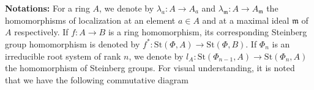 \documentclass[11pt]{amsart}
\theoremstyle{definition}
\numberwithin{equation}{section}
\numberwithin{equation}{section}
\newcommand{\<}{\langle}
\renewcommand{\>}{\rangle}
\newcommand{\St}{\mathrm{St}}
\begin{document}
\textbf{Notations:} For a ring $A$, we denote by $\lambda_{a}:A\to A_{a}$ and $\lambda_{\mathfrak{m}}:A\to A_{\mathfrak{m}}$ the homomorphisms of localization at an element $a\in A$ and at a maximal ideal $\mathfrak{m}$ of $A$ respectively. If $f:A\to B$ is a ring homomorphism, its corresponding Steinberg group homomorphism is denoted by $f^{\ast}:\St(\Phi,A)\to \St(\Phi,B)$. If $\Phi_{n}$ is an irreducible root system of rank $n$, we denote by $l_{A}:\St(\Phi_{n-1},A)\to \St(\Phi_{n},A)$ the homomorphism of Steinberg groups. For visual understanding, it is noted that we have the following commutative diagram
\begin{center}
\end{center}
\end{document}
